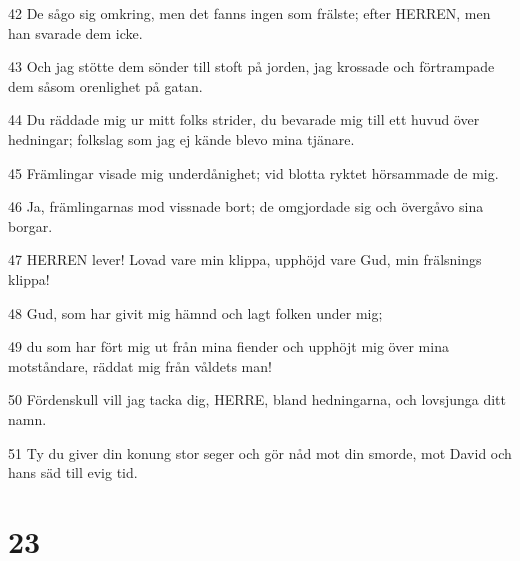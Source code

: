 \par 42 De sågo sig omkring, men det fanns ingen som frälste; efter HERREN, men han svarade dem icke.
\par 43 Och jag stötte dem sönder till stoft på jorden, jag krossade och förtrampade dem såsom orenlighet på gatan.
\par 44 Du räddade mig ur mitt folks strider, du bevarade mig till ett huvud över hedningar; folkslag som jag ej kände blevo mina tjänare.
\par 45 Främlingar visade mig underdånighet; vid blotta ryktet hörsammade de mig.
\par 46 Ja, främlingarnas mod vissnade bort; de omgjordade sig och övergåvo sina borgar.
\par 47 HERREN lever! Lovad vare min klippa, upphöjd vare Gud, min frälsnings klippa!
\par 48 Gud, som har givit mig hämnd och lagt folken under mig;
\par 49 du som har fört mig ut från mina fiender och upphöjt mig över mina motståndare, räddat mig från våldets man!
\par 50 Fördenskull vill jag tacka dig, HERRE, bland hedningarna, och lovsjunga ditt namn.
\par 51 Ty du giver din konung stor seger och gör nåd mot din smorde, mot David och hans säd till evig tid.

\chapter{23}

